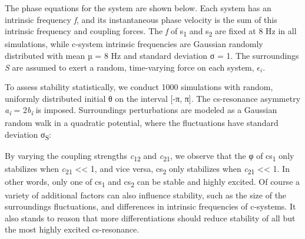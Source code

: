 

  The phase equations for the system are shown below. Each system has an intrinsic frequency \textit{f}, and its instantaneous phase velocity is the sum of this intrinsic frequency and coupling forces. The \textit{f} of s\textsubscript{1} and s\textsubscript{2} are fixed at 8 Hz in all simulations, while c-system intrinsic frequencies are Gaussian randomly distributed with mean µ = 8 Hz and standard deviation σ = 1. The surroundings \textit{S} are assumed to exert a random, time-varying force on each system,  ${\epsilon} _{i}$. 


  To assess stability statistically, we conduct 1000 simulations with random, uniformly distributed initial θ on the interval [-π, π]. The cs-resonance asymmetry \textit{a\textsubscript{i}} = 2\textit{b\textsubscript{i}} is imposed. Surroundings perturbations are modeled as a Gaussian random walk in a quadratic potential, where the fluctuations have standard deviation σ\textsubscript{S}:

 

  By varying the coupling strengths \textit{c}\textsubscript{12} and \textit{c}\textsubscript{21},  we observe that the φ of cs\textsubscript{1} only stabilizes when \textit{c}\textsubscript{21} << 1, and vice versa, cs\textsubscript{2} only stabilizes when \textit{c}\textsubscript{21} << 1. In other words, only one of cs\textsubscript{1} and cs\textsubscript{2} can be stable and highly excited. Of course a variety of additional factors can also influence stability, such as the size of the surroundings fluctuations, and differences in intrinsic frequencies of c-systems. It also stands to reason that more differentiations should reduce stability of all but the most highly excited cs-resonance.

